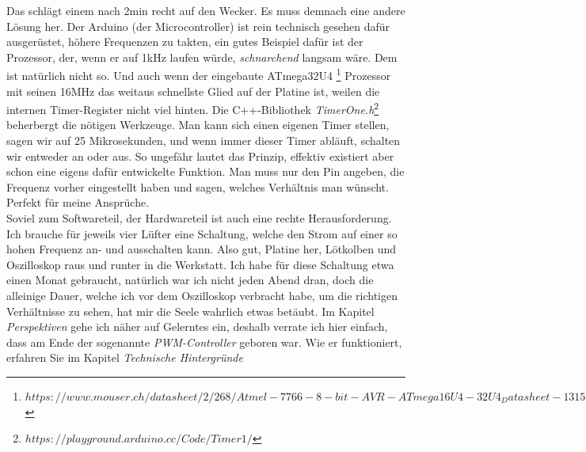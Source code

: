 \documentclass[12pt,titlepage,a4paper]{article}
\begin{document}
Das schlägt einem nach 2min recht auf den Wecker. Es muss demnach eine andere Lösung her. Der Arduino (der Microcontroller) ist rein technisch gesehen dafür ausgerüstet, höhere Frequenzen zu takten, ein gutes Beispiel dafür ist der Prozessor, der, wenn er auf 1kHz laufen würde, \textit{schnarchend} langsam wäre. Dem ist natürlich nicht so. Und auch wenn der eingebaute ATmega32U4
\footnote{$https://www.mouser.ch/datasheet/2/268/Atmel-7766-8-bit-AVR-ATmega16U4-32U4_Datasheet-1315135.pdf$}
Prozessor mit seinen 16MHz das weitaus schnellste Glied auf der Platine ist, weilen die internen Timer-Register nicht viel hinten. Die C++-Bibliothek \textit{TimerOne.h}\footnote{$https://playground.arduino.cc/Code/Timer1/$} beherbergt die nötigen Werkzeuge. Man kann sich einen eigenen Timer stellen, sagen wir auf 25 Mikrosekunden, und wenn immer dieser Timer abläuft, schalten wir entweder an oder aus. So ungefähr lautet das Prinzip, effektiv existiert aber schon eine eigens dafür entwickelte Funktion. Man muss nur den Pin angeben, die Frequenz vorher eingestellt haben und sagen, welches Verhältnis man wünscht. Perfekt für meine Ansprüche. \\
Soviel zum Softwareteil, der Hardwareteil ist auch eine rechte Herausforderung. Ich brauche für jeweils vier Lüfter eine Schaltung, welche den Strom auf einer so hohen Frequenz an- und ausschalten kann. Also gut, Platine her, Lötkolben und Oszilloskop raus und runter in die Werkstatt. Ich habe für diese Schaltung etwa einen Monat gebraucht, natürlich war ich nicht jeden Abend dran, doch die alleinige Dauer, welche ich vor dem Oszilloskop verbracht habe, um die richtigen Verhältnisse zu sehen, hat mir die Seele wahrlich etwas betäubt. Im Kapitel \textit{Perspektiven} gehe ich näher auf Gelerntes ein, deshalb verrate ich hier einfach, dass am Ende der sogenannte \textit{PWM-Controller} geboren war. Wie er funktioniert, erfahren Sie im Kapitel \textit{Technische Hintergründe}
\end{document}

